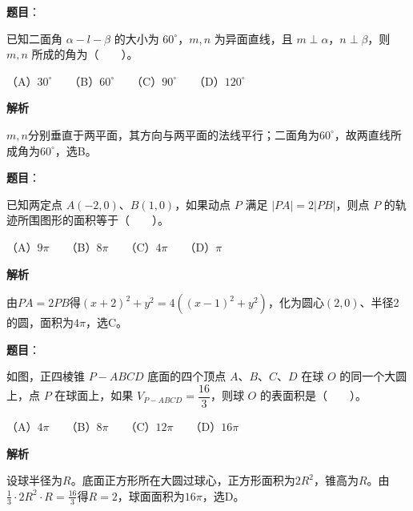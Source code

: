 \begin{answer}

\textbf{题目}：

已知二面角 $\alpha-l-\beta$ 的大小为 $60^\circ$，$m,n$ 为异面直线，且 $m\perp\alpha$，$n\perp\beta$，则 $m,n$ 所成的角为\mbox{（　　）}。

（A）$30^\circ$　　（B）$60^\circ$　　（C）$90^\circ$　　（D）$120^\circ$

\textbf{解析}

$m,n$分别垂直于两平面，其方向与两平面的法线平行；二面角为$60^\circ$，故两直线所成角为$60^\circ$，选B。


\end{answer}
\begin{answer}

\textbf{题目}：

已知两定点 $A(-2,0)$、$B(1,0)$，如果动点 $P$ 满足 $|PA|=2|PB|$，则点 $P$ 的轨迹所围图形的面积等于\mbox{（　　）}。

（A）$9\pi$　　（B）$8\pi$　　（C）$4\pi$　　（D）$\pi$

\textbf{解析}

由$PA=2PB$得$(x+2)^2+y^2=4((x-1)^2+y^2)$，化为圆心$(2,0)$、半径2的圆，面积为$4\pi$，选C。


\end{answer}
\begin{answer}

\textbf{题目}：

如图，正四棱锥 $P-ABCD$ 底面的四个顶点 $A\text{、}B\text{、}C\text{、}D$ 在球 $O$ 的同一个大圆上，点 $P$ 在球面上，如果 $V_{P-ABCD}=\dfrac{16}{3}$，则球 $O$ 的表面积是\mbox{（　　）}。
\nopagebreak[4]
\begin{center}\end{center}
\nopagebreak[4]
（A）$4\pi$　　（B）$8\pi$　　（C）$12\pi$　　（D）$16\pi$

\textbf{解析}

设球半径为$R$。底面正方形所在大圆过球心，正方形面积为$2R^2$，锥高为$R$。由$\frac13\cdot2R^2\cdot R=\frac{16}{3}$得$R=2$，球面面积为$16\pi$，选D。


\end{answer}
